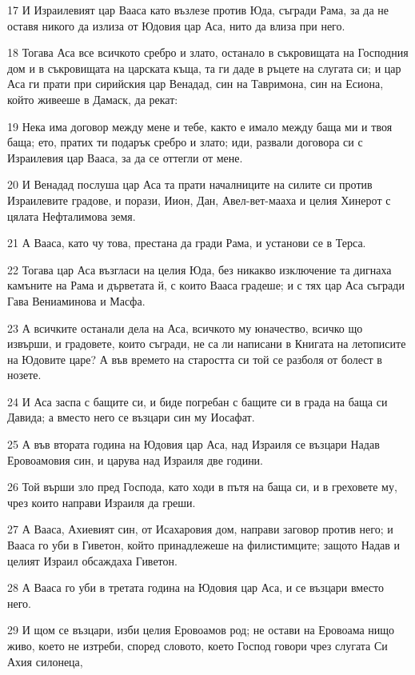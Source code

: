 \par 17 И Израилевият цар Вааса като възлезе против Юда, съгради Рама, за да не оставя никого да излиза от Юдовия цар Аса, нито да влиза при него.
\par 18 Тогава Аса все всичкото сребро и злато, останало в съкровищата на Господния дом и в съкровищата на царската къща, та ги даде в ръцете на слугата си; и цар Аса ги прати при сирийския цар Венадад, син на Тавримона, син на Есиона, който живееше в Дамаск, да рекат:
\par 19 Нека има договор между мене и тебе, както е имало между баща ми и твоя баща; ето, пратих ти подарък сребро и злато; иди, развали договора си с Израилевия цар Вааса, за да се оттегли от мене.
\par 20 И Венадад послуша цар Аса та прати началниците на силите си против Израилевите градове, и порази, Иион, Дан, Авел-вет-мааха и целия Хинерот с цялата Нефталимова земя.
\par 21 А Вааса, като чу това, престана да гради Рама, и установи се в Терса.
\par 22 Тогава цар Аса възгласи на целия Юда, без никакво изключение та дигнаха камъните на Рама и дърветата й, с които Вааса градеше; и с тях цар Аса съгради Гава Вениаминова и Масфа.
\par 23 А всичките останали дела на Аса, всичкото му юначество, всичко що извърши, и градовете, които съгради, не са ли написани в Книгата на летописите на Юдовите царе? А във времето на старостта си той се разболя от болест в нозете.
\par 24 И Аса заспа с бащите си, и биде погребан с бащите си в града на баща си Давида; а вместо него се възцари син му Иосафат.
\par 25 А във втората година на Юдовия цар Аса, над Израиля се възцари Надав Еровоамовия син, и царува над Израиля две години.
\par 26 Той върши зло пред Господа, като ходи в пътя на баща си, и в греховете му, чрез които направи Израиля да греши.
\par 27 А Вааса, Ахиевият син, от Исахаровия дом, направи заговор против него; и Вааса го уби в Гиветон, който принадлежеше на филистимците; защото Надав и целият Израил обсаждаха Гиветон.
\par 28 А Вааса го уби в третата година на Юдовия цар Аса, и се възцари вместо него.
\par 29 И щом се възцари, изби целия Еровоамов род; не остави на Еровоама нищо живо, което не изтреби, според словото, което Господ говори чрез слугата Си Ахия силонеца,

